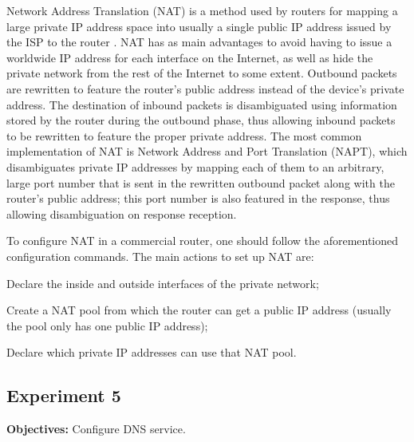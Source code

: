 \documentclass[a4paper, 11pt]{report}
\begin{document}
Network Address Translation (NAT) is a method used by routers for mapping a large private IP address space into usually a single public IP address issued by the ISP to the router \cite{rfc2663}.
NAT has as main advantages to avoid having to issue a worldwide IP address for each interface on the Internet, as well as hide the private network from the rest of the Internet to some extent.
Outbound packets are rewritten to feature the router's public address instead of the device's private address.
The destination of inbound packets is disambiguated using information stored by the router during the outbound phase, thus allowing inbound packets to be rewritten to feature the proper private address.
The most common implementation of NAT is Network Address and Port Translation (NAPT), which disambiguates private IP addresses by mapping each of them to an arbitrary, large port number that is sent in the rewritten outbound packet along with the router's public address; this port number is also featured in the response, thus allowing disambiguation on response reception.

To configure NAT in a commercial router, one should follow the aforementioned configuration commands. The main actions to set up NAT are:
\begin{enumerate*}
    \item Declare the inside and outside interfaces of the private network;
    \item Create a NAT pool from which the router can get a public IP address (usually the pool only has one public IP address);
    \item Declare which private IP addresses can use that NAT pool.
\end{enumerate*}

\subsection{Experiment 5} \label{sec:Exp5}

\textbf{Objectives:} Configure DNS service.
\end{document}
